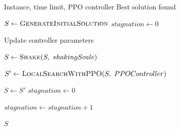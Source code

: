 \begin{algorithm}[H]
\caption{GVNS with PPO-Driven Local Search}
\label{alg:ppo_gvns}
\begin{algorithmic}[1]

\Require Instance, time limit, PPO controller
\Ensure Best solution found

\State $S \gets \Call{GenerateInitialSolution}{}$
\State $stagnation \gets 0$


    \State Update controller parameters

    \State $S \gets \Call{Shake}{S,\ shakingScale}$
    
    \State $S' \gets
        \Call{LocalSearchWithPPO}
        {S,\ PPOController}$


        \State $S \gets S'$
        \State $stagnation \gets 0$

    \Else

        \State $stagnation \gets stagnation + 1$

    \EndIf

    \State {}

\EndWhile

\State \Return $S$

\end{algorithmic}
\end{algorithm}



